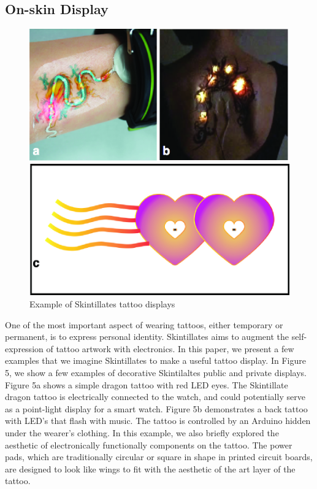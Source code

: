 \documentclass{sigchi}
\begin{document}
\subsection{On-skin Display}
\begin{figure}[!h]
\centering
\includegraphics[width=1\columnwidth]{figures/Figure5}
\caption{Example of Skintillates tattoo displays}
\label{fig:figure5}
\end{figure}
One of the most important aspect of wearing tattoos, either temporary or permanent, is to express personal identity. 
Skintillates aims to augment the self-expression of tattoo artwork with electronics. 
In this paper, we present a few examples that we imagine Skintillates to make a useful tattoo display. 
In Figure 5, we show a few examples of decorative Skintilaltes public and private displays. Figure 5a shows a simple dragon tattoo with red LED eyes. The Skintillate dragon tattoo is electrically connected to the watch, and could potentially serve as a point-light display for a smart watch. Figure 5b demonstrates a back tattoo with LED’s that flash with music. The tattoo is controlled by an Arduino hidden under the wearer’s clothing. In this example, we also briefly explored the aesthetic of electronically functionally components on the tattoo. The power pads, which are traditionally circular or square in shape in printed circuit boards, are designed to look like wings to fit with the aesthetic of the art layer of the tattoo. 
\end{document}
